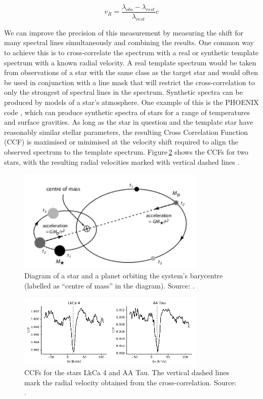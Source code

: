 \begin{equation}
    v_{R} = \frac{\lambda_{obs}-\lambda_{rest}}{\lambda_{rest}}c
    \label{eqRV}
\end{equation}

We can improve the precision of this measurement by measuring the shift for many spectral lines simultaneously and combining the results. One common way to achieve this is to cross-correlate the spectrum with a real or synthetic template spectrum with a known radial velocity. A real template spectrum would be taken from observations of a star with the same class as the target star and would often be used in conjunction with a line mask that will restrict the cross-correlation to only the strongest of spectral lines in the spectrum. Synthetic spectra can be  produced by models of a star's atmosphere. One example of this is the PHOENIX code \citep{Phoenix}, which can produce synthetic spectra of stars for a range of temperatures and surface gravities. As long as the star in question and the template star have reasonably similar stellar parameters, the resulting Cross Correlation Function (CCF) is maximised or minimised at the velocity shift required to align the observed spectrum to the template spectrum. Figure\,\ref{figCCF} shows the CCFs for two stars, with the resulting radial velocities marked with vertical dashed lines \citep{2020Morris}. \\

\label{secRV}
\begin{figure}
    \centering
    \includegraphics[width=0.8\textwidth]{Barycentre.png}
    \caption{Diagram of a star and a planet orbiting the system's barycentre (labelled as ``centre of mass'' in the diagram). Source: \cite{2011Perryman}.}
    \label{figBary}
\end{figure}

\begin{figure}
    \centering
    \includegraphics[width=0.8\textwidth]{CCF.png}
    \caption{CCFs for the stars LkCa 4 and AA Tau. The vertical dashed lines mark the radial velocity obtained from the cross-correlation. Source: \citet{2020Morris}.}
    \label{figCCF}
\end{figure}

